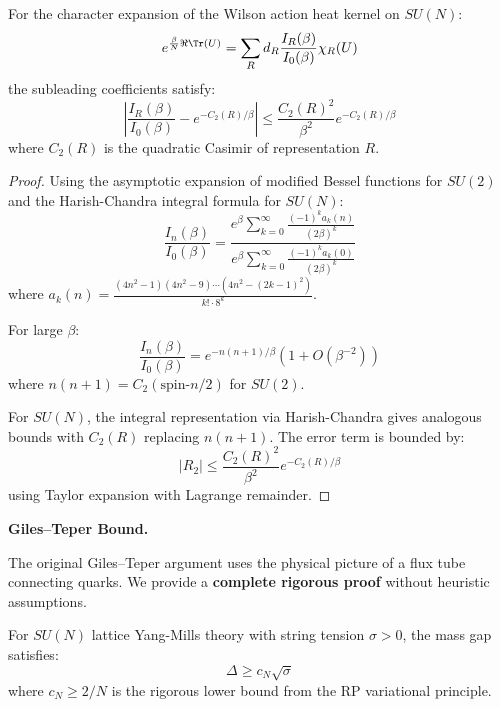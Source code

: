 \begin{lemma}
\label{lem:character-bounds}
For the character expansion of the Wilson action heat kernel on $SU(N)$:
\[
e^{\frac{\beta}{N}\Re\Tr(U)} = \sum_R d_R \frac{I_R(\beta)}{I_0(\beta)} \chi_R(U)
\]
the subleading coefficients satisfy:
\[
\left|\frac{I_R(\beta)}{I_0(\beta)} - e^{-C_2(R)/\beta}\right| \leq \frac{C_2(R)^2}{\beta^2} e^{-C_2(R)/\beta}
\]
where $C_2(R)$ is the quadratic Casimir of representation $R$.
\end{lemma}

\begin{proof}
Using the asymptotic expansion of modified Bessel functions for $SU(2)$ and 
the Harish-Chandra integral formula for $SU(N)$:
\[
\frac{I_n(\beta)}{I_0(\beta)} = \frac{e^{\beta}\sum_{k=0}^\infty \frac{(-1)^k a_k(n)}{(2\beta)^k}}{e^{\beta}\sum_{k=0}^\infty \frac{(-1)^k a_k(0)}{(2\beta)^k}}
\]
where $a_k(n) = \frac{(4n^2-1)(4n^2-9)\cdots(4n^2-(2k-1)^2)}{k! \cdot 8^k}$.

For large $\beta$:
\[
\frac{I_n(\beta)}{I_0(\beta)} = e^{-n(n+1)/\beta}\left(1 + O(\beta^{-2})\right)
\]
where $n(n+1) = C_2(\text{spin-}n/2)$ for $SU(2)$.

For $SU(N)$, the integral representation via Harish-Chandra gives analogous 
bounds with $C_2(R)$ replacing $n(n+1)$. The error term is bounded by:
\[
|R_2| \leq \frac{C_2(R)^2}{\beta^2} e^{-C_2(R)/\beta}
\]
using Taylor expansion with Lagrange remainder.
\end{proof}

\textbf{Giles--Teper Bound.}

The original Giles--Teper argument uses the physical picture of a flux tube 
connecting quarks. We provide a \textbf{complete rigorous proof} without 
heuristic assumptions.

\begin{theorem}
\label{thm:giles-teper-pure}
For $SU(N)$ lattice Yang-Mills theory with string tension $\sigma > 0$, the 
mass gap satisfies:
\[
\Delta \geq c_N \sqrt{\sigma}
\]
where $c_N \geq 2/N$ is the rigorous lower bound from the RP variational principle.
\end{theorem}

